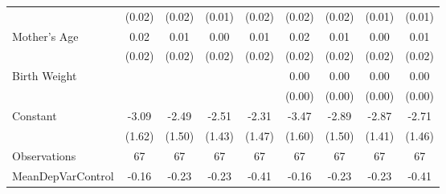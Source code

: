 {\begin{tabular}{l*{8}{c}}
                    &      (0.02)         &      (0.02)         &      (0.01)         &      (0.02)         &      (0.02)         &      (0.02)         &      (0.01)         &      (0.01)         \\
[1em]
Mother's Age        &        0.02         &        0.01         &        0.00         &        0.01         &        0.02         &        0.01         &        0.00         &        0.01         \\
                    &      (0.02)         &      (0.02)         &      (0.02)         &      (0.02)         &      (0.02)         &      (0.02)         &      (0.02)         &      (0.02)         \\
[1em]
Birth Weight        &                     &                     &                     &                     &        0.00         &        0.00         &        0.00         &        0.00         \\
                    &                     &                     &                     &                     &      (0.00)         &      (0.00)         &      (0.00)         &      (0.00)         \\
[1em]
Constant            &       -3.09\sym{*}  &       -2.49         &       -2.51\sym{*}  &       -2.31         &       -3.47\sym{**} &       -2.89\sym{*}  &       -2.87\sym{**} &       -2.71\sym{*}  \\
                    &      (1.62)         &      (1.50)         &      (1.43)         &      (1.47)         &      (1.60)         &      (1.50)         &      (1.41)         &      (1.46)         \\
\hline
Observations        &          67         &          67         &          67         &          67         &          67         &          67         &          67         &          67         \\
MeanDepVarControl   &       -0.16         &       -0.23         &       -0.23         &       -0.41         &       -0.16         &       -0.23         &       -0.23         &       -0.41         \\
\hline\hline
\end{tabular}
}
